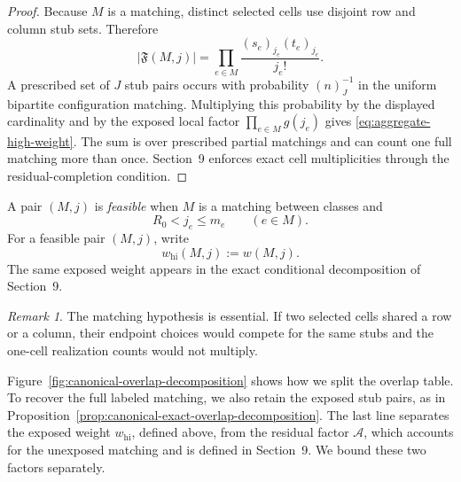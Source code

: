 \documentclass[a4paper,10pt,reqno]{amsart}
\numberwithin{equation}{section}
\theoremstyle{plain}
\theoremstyle{remark}
\newtheorem{remark}[theorem]{Remark}
\begin{document}
\begin{proof}
Because $M$ is a matching, distinct selected cells use disjoint row and column
stub sets. Therefore
\[
  |\mathfrak F(M,j)|
  =\prod_{e\in M}\frac{(s_e)_{j_e}(t_e)_{j_e}}{j_e!}.
\]
A prescribed set of $J$ stub pairs occurs with probability $(n)_J^{-1}$ in the
uniform bipartite configuration matching. Multiplying this probability by the
displayed cardinality and by the exposed local factor
$\prod_{e\in M}g(j_e)$ gives \eqref{eq:aggregate-high-weight}.
The sum is over prescribed partial matchings and can count one full
matching more than once. Section~9 enforces exact cell multiplicities
through the residual-completion condition.
\end{proof}

A pair $(M,j)$ is \emph{feasible} when $M$ is a matching between classes and
\[
  R_0<j_e\le m_e\qquad(e\in M).
\]
For a feasible pair $(M,j)$, write
\[
  w_{\mathrm{hi}}(M,j):=w(M,j).
\]
The same exposed weight appears in the exact conditional decomposition
of Section~9.

\begin{remark}
The matching hypothesis is essential. If two selected cells shared a row or
a column, their endpoint choices would compete for the same stubs and the
one-cell realization counts would not multiply.
\end{remark}

Figure~\ref{fig:canonical-overlap-decomposition} shows how we split the
overlap table. To recover the full labeled matching, we also retain the
exposed stub pairs, as in
Proposition~\ref{prop:canonical-exact-overlap-decomposition}. The last
line separates the exposed weight $w_{\mathrm{hi}}$, defined above, from
the residual factor $\mathcal A$, which accounts for the unexposed matching
and is defined in Section~9. We bound these two factors separately.
\end{document}
